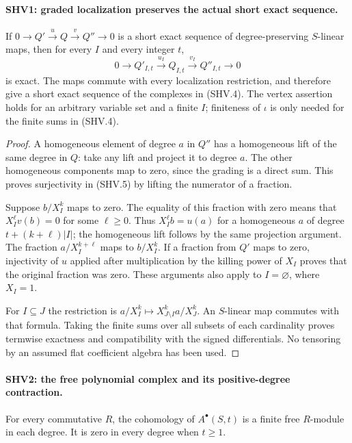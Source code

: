 \documentclass[11pt,a4paper]{article}
\numberwithin{equation}{section}
\theoremstyle{remark}\newtheorem{remark}[theorem]{Remark}
\begin{document}
\paragraph{SHV1: graded localization preserves the actual short exact sequence.}
\label{claim:SHV1}
If $0\to Q'\xrightarrow{u}Q\xrightarrow{v}Q''\to0$ is a short
exact sequence of degree-preserving $S$-linear maps, then for every
$I$ and every integer $t$,
\[
 0\longrightarrow Q'_{I,t}\xrightarrow{u_I}Q_{I,t}
   \xrightarrow{v_I}Q''_{I,t}\longrightarrow0
                                                        \tag{SHV.5}
\]
is exact.  The maps commute with every localization restriction, and
therefore give a short exact sequence of the complexes in (SHV.4).
The vertex assertion holds for an arbitrary variable set and a finite
$I$; finiteness of $\iota$ is only needed for the finite sums in (SHV.4).

\begin{proof}
A homogeneous element of degree $a$ in $Q''$ has a homogeneous lift
of the same degree in $Q$: take any lift and project it to degree $a$.
The other homogeneous components map to zero, since the grading is a
direct sum.  This proves surjectivity in (SHV.5) by lifting the
numerator of a fraction.

Suppose $b/X_I^k$ maps to zero.  The equality of this fraction with
zero means that $X_I^\ell v(b)=0$ for some $\ell\ge0$.
Thus $X_I^\ell b=u(a)$ for a homogeneous $a$ of degree
$t+(k+\ell)|I|$; the homogeneous lift follows by the same projection
argument.  The fraction $a/X_I^{k+\ell}$ maps to $b/X_I^k$.
If a fraction from $Q'$ maps to zero, injectivity of $u$ applied
after multiplication by the killing power of $X_I$ proves that the
original fraction was zero.  These arguments also apply to
$I=\varnothing$, where $X_I=1$.

For $I\subseteq J$ the restriction is
$a/X_I^k\mapsto X_{J\setminus I}^ka/X_J^k$.
An $S$-linear map commutes with that formula.  Taking the finite
sums over all subsets of each cardinality proves termwise exactness
and compatibility with the signed differentials.  No tensoring by
an assumed flat coefficient algebra has been used.
\end{proof}

\paragraph{SHV2: the free polynomial complex and its positive-degree contraction.}
\label{claim:SHV2}
For every commutative $R$, the cohomology of $A^\bullet(S,t)$
is a finite free $R$-module in each degree.  It is zero in every
degree when $t\ge1$.
\end{document}
